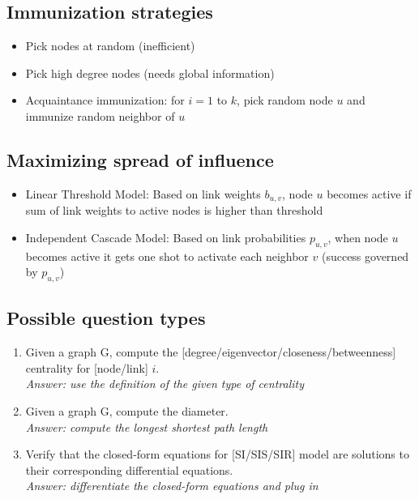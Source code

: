 \documentclass{article}
\begin{document}
\subsection{Immunization strategies}

\begin{itemize}
\item Pick nodes at random (inefficient)
\item Pick high degree nodes (needs global information)
\item Acquaintance immunization: for $i = 1$ to $k$, pick random node $u$ and immunize random neighbor of $u$
\end{itemize}

\subsection{Maximizing spread of influence}

\begin{itemize}
\item Linear Threshold Model: Based on link weights $b_{u,v}$, node $u$ becomes active if sum of link weights to active nodes is higher than threshold
\item Independent Cascade Model: Based on link probabilities $p_{u,v}$, when node $u$ becomes active it gets one shot to activate each neighbor $v$ (success governed by $p_{u,v}$)
\end{itemize}

\subsection{Possible question types}

\begin{enumerate}
\item Given a graph G, compute the [degree/eigenvector/closeness/betweenness] centrality for [node/link] $i$. \\
\textit{Answer: use the definition of the given type of centrality}
\item Given a graph G, compute the diameter. \\
\textit{Answer: compute the longest shortest path length}
\item Verify that the closed-form equations for [SI/SIS/SIR] model are solutions to their corresponding differential equations. \\
\textit{Answer: differentiate the closed-form equations and plug in}
\end{enumerate}
\end{document}
